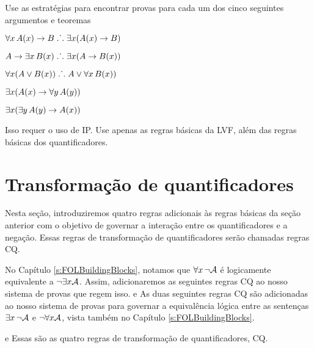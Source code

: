 \problempart
Use as estratégias para encontrar provas para cada um dos cinco seguintes argumentos e teoremas
\begin{earg}
\item $\forall x\,\mathord{A}(x) \rightarrow B \mathrel{\ldotp\dot{}\,\ldotp} \exists x(\mathord{A}(x) \rightarrow B)$
\item $A \rightarrow \exists x\, \mathord{B}(x) \mathrel{\ldotp\dot{}\,\ldotp} \exists x(A \rightarrow \mathord{B}(x))$
\item $\forall x(A \vee \mathord{B}(x)) \mathrel{\ldotp\dot{}\,\ldotp} A \vee \forall x\,\mathord{B}(x))$
\item $\exists x(\mathord{A}(x) \rightarrow \forall y\,\mathord{A}(y))$
\item $\exists x(\exists y\,\mathord{A}(y) \rightarrow \mathord{A}(x))$
\end{earg}
Isso requer o uso de IP. Use apenas as regras básicas da LVF, além das regras básicas dos quantificadores.


\chapter{Transformação de quantificadores}\label{s:CQ}

Nesta seção, introduziremos quatro regras adicionais às regras básicas da seção anterior com o objetivo de governar a interação entre os quantificadores e a negação. Essas regras de transformação de quantificadores serão chamadas regras CQ.
 
No Capítulo  \ref{s:FOLBuildingBlocks}, notamos que $\forall x\, \neg\mathcal{A}$
   é logicamente equivalente a  $\neg\exists x\mathcal{A}$. Assim, adicionaremos as seguintes regras CQ ao nosso sistema de provas que regem isso. 
e
As duas seguintes  regras CQ  são adicionadas ao nosso sistema de provas para governar a equivalência lógica entre as sentenças $\exists x\, \neg\mathcal{A}$  e   $\neg\forall x\mathcal{A}$, vista também no  Capítulo  \ref{s:FOLBuildingBlocks}.

 
e
Essas são as quatro regras de transformação de quantificadores, CQ.

